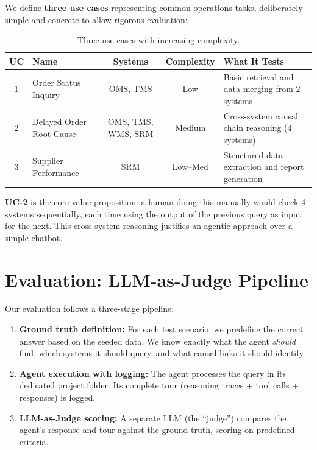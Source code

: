 \documentclass[12pt,a4paper]{report}
\begin{document}
We define \textbf{three use cases} representing common operations tasks, deliberately simple and concrete to allow rigorous evaluation:

\begin{table}[H]
\centering\small
\caption{Three use cases with increasing complexity.}
\begin{tabularx}{\textwidth}{@{} c l c c X @{}}
\toprule
\textbf{UC} & \textbf{Name} & \textbf{Systems} & \textbf{Complexity} & \textbf{What It Tests} \\
\midrule
1 & Order Status Inquiry          & OMS, TMS       & Low    & Basic retrieval and data merging from 2 systems \\
2 & Delayed Order Root Cause      & OMS, TMS, WMS, SRM & Medium & Cross-system causal chain reasoning (4 systems) \\
3 & Supplier Performance          & SRM            & Low--Med & Structured data extraction and report generation \\
\bottomrule
\end{tabularx}
\end{table}

\textbf{UC-2} is the core value proposition: a human doing this manually would check 4 systems sequentially, each time using the output of the previous query as input for the next. This cross-system reasoning justifies an agentic approach over a simple chatbot.

\section{Evaluation: LLM-as-Judge Pipeline}

Our evaluation follows a three-stage pipeline:

\begin{enumerate}[itemsep=0.3em]
    \item \textbf{Ground truth definition:} For each test scenario, we predefine the correct answer based on the seeded data. We know exactly what the agent \textit{should} find, which systems it should query, and what causal links it should identify.
    \item \textbf{Agent execution with logging:} The agent processes the query in its dedicated project folder. Its complete tour (reasoning traces + tool calls + responses) is logged.
    \item \textbf{LLM-as-Judge scoring:} A separate LLM (the ``judge'') compares the agent's response and tour against the ground truth, scoring on predefined criteria.
\end{enumerate}
\end{document}
